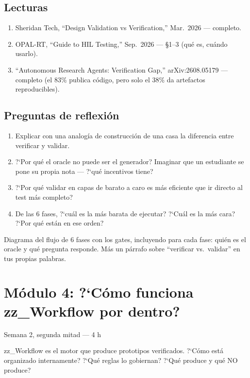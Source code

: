 \documentclass[11pt,a4paper]{article}
\newcommand{\timeest}[1]{\textsf{\footnotesize\color{muted}#1}}
\begin{document}
\subsection{Lecturas}
\begin{enumerate}[label=\textbf{L\arabic*.}]
  \item Sheridan Tech, ``Design Validation vs Verification,'' Mar.\ 2026 --- completo.
  \item OPAL-RT, ``Guide to HIL Testing,'' Sep.\ 2026 --- \S1--3 (qu\'e es, cu\'ando usarlo).
  \item ``Autonomous Research Agents: Verification Gap,'' arXiv:2608.05179 --- completo (el 83\% publica c\'odigo, pero solo el 38\% da artefactos reproducibles).
\end{enumerate}

\subsection{Preguntas de reflexi\'on}
\begin{enumerate}[label=\textbf{R\arabic*.}]
  \item Explicar con una analog\'ia de construcci\'on de una casa la diferencia entre verificar y validar.
  \item ?`Por qu\'e el oracle no puede ser el generador? Imaginar que un estudiante se pone su propia nota --- ?`qu\'e incentivos tiene?
  \item ?`Por qu\'e validar en capas de barato a caro es m\'as eficiente que ir directo al test m\'as completo?
  \item De las 6 fases, ?`cu\'al es la m\'as barata de ejecutar? ?`Cu\'al es la m\'as cara? ?`Por qu\'e est\'an en ese orden?
\end{enumerate}

\begin{deliverbox}[Entregable]
Diagrama del flujo de 6 fases con los gates, incluyendo para cada fase: qui\'en es el oracle y qu\'e pregunta responde. M\'as un p\'arrafo sobre ``verificar vs.\ validar'' en tus propias palabras.
\end{deliverbox}

\section{M\'odulo 4: ?`C\'omo funciona zz\_Workflow por dentro?}
\timeest{Semana 2, segunda mitad --- 4 h}

\begin{goalbox}
zz\_Workflow es el motor que produce prototipos verificados. ?`C\'omo est\'a organizado internamente? ?`Qu\'e reglas lo gobiernan? ?`Qu\'e produce y qu\'e NO produce?
\end{goalbox}
\end{document}
